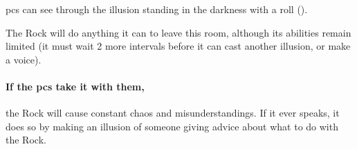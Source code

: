 \Glspl{pc} can see through the illusion standing in the darkness with a  roll
(\tn[12]).

The Rock will do anything it can to leave this room, although its abilities remain limited (it must wait 2 more \glspl{interval} before it can cast another illusion, or make a voice).

\paragraph{If the \glspl{pc} take it with them,}
the Rock will cause constant chaos and misunderstandings.
If it ever speaks, it does so by making an illusion of someone giving advice about what to do with the Rock.

